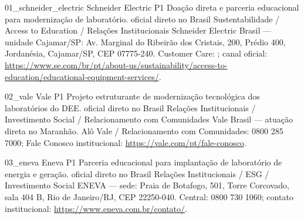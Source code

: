 \newcommand{\selecionaContato}[1]{%
  \ifcsdef{contato@#1@setor}{%
    \renewcommand{\empresaContato}{\csuse{contato@#1@empresa}}%
    \renewcommand{\prioridade}{\rotuloPrioridade{\csuse{contato@#1@nivel}}}%
    \renewcommand{\estrategia}{\csuse{contato@#1@estrategia}}%
    \renewcommand{\statusContatoBrasil}{\csuse{contato@#1@status}}%
    \renewcommand{\contatoPrioritario}{\csuse{contato@#1@setor}}%
    \renewcommand{\contatoBrasil}{\csuse{contato@#1@canal}}%
  }{}%
}

\newcommand{\selecionaContatoPeloArquivo}{%
  \selecionaContato{\jobname}%
  \selecionaContato{empresas/\jobname}%
}

\ContatoEmpresa
  {01_schneider_electric}
  {Schneider Electric}
  {P1}
  {Doação direta e parceria educacional para modernização de laboratório.}
  {oficial direto no Brasil}
  {Sustentabilidade / Access to Education / Relações Institucionais}
  {Schneider Electric Brasil — unidade Cajamar/SP: Av. Marginal do Ribeirão dos Cristais, 200, Prédio 400, Jordanésia, Cajamar/SP, CEP 07775-240. Customer Care: ; canal oficial: \url{https://www.se.com/br/pt/about-us/sustainability/access-to-education/educational-equipment-services/}.}

\ContatoEmpresa
  {02_vale}
  {Vale}
  {P1}
  {Projeto estruturante de modernização tecnológica dos laboratórios do DEE.}
  {oficial direto no Brasil}
  {Relações Institucionais / Investimento Social / Relacionamento com Comunidades}
  {Vale Brasil — atuação direta no Maranhão. Alô Vale / Relacionamento com Comunidades: 0800 285 7000; Fale Conosco institucional: \url{https://vale.com/pt/fale-conosco}.}

\ContatoEmpresa
  {03_eneva}
  {Eneva}
  {P1}
  {Parceria educacional para implantação de laboratório de energia e geração.}
  {oficial direto no Brasil}
  {Relações Institucionais / ESG / Investimento Social}
  {ENEVA — sede: Praia de Botafogo, 501, Torre Corcovado, sala 404 B, Rio de Janeiro/RJ, CEP 22250-040. Central: 0800 730 1060; contato institucional: \url{https://www.eneva.com.br/contato/}.}

